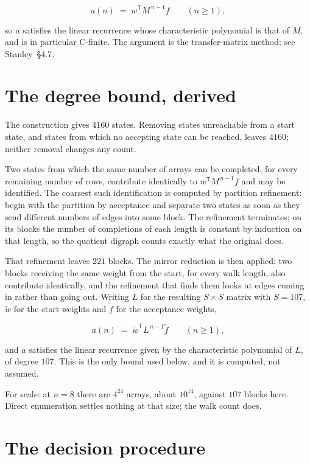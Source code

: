 \documentclass[11pt]{article}
\theoremstyle{definition}
\begin{document}
\[a(n) \;=\; w^{\mathsf T} M^{\,n-1} f \qquad (n \ge 1),\]

so $a$ satisfies the linear recurrence whose characteristic polynomial is that of $M$, and is in particular C-finite. The argument is the transfer-matrix method; see Stanley~\S4.7.

\section{The degree bound, derived}

The construction gives $4160$ states. Removing states unreachable from a start state, and states from which no accepting state can be reached, leaves $4160$; neither removal changes any count.

Two states from which the same number of arrays can be completed, for every remaining number of rows, contribute identically to $w^{\mathsf T}M^{\,n-1}f$ and may be identified. The coarsest such identification is computed by partition refinement: begin with the partition by acceptance and separate two states as soon as they send different numbers of edges into some block. The refinement terminates; on its blocks the number of completions of each length is constant by induction on that length, so the quotient digraph counts exactly what the original does.

That refinement leaves $221$ blocks. The mirror reduction is then applied: two blocks receiving the same weight from the start, for every walk length, also contribute identically, and the refinement that finds them looks at edges coming in rather than going out. Writing $L$ for the resulting $S \times S$ matrix with $S = 107$, $\tilde w$ for the start weights and $\tilde f$ for the acceptance weights,

\[a(n) \;=\; \tilde w^{\mathsf T} L^{\,n-1} \tilde f \qquad (n \ge 1),\]

and $a$ satisfies the linear recurrence given by the characteristic polynomial of $L$, of degree $107$. This is the only bound used below, and it is computed, not assumed.

For scale: at $n = 8$ there are $4^{24}$ arrays, about $10^{14}$, against $107$ blocks here. Direct enumeration settles nothing at that size; the walk count does.

\section{The decision procedure}
\end{document}
